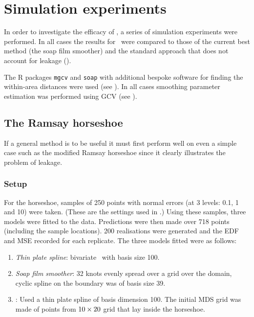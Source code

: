 \section{Simulation experiments}
\label{mdssims}

In order to investigate the efficacy of \mdsap, a series of simulation experiments were performed. In all cases the results for \mdsap\ were compared to those of the current best method (the soap film smoother) and the standard approach that does not account for leakage (\tprs).

The \textsf{R} packages \texttt{mgcv} and \texttt{soap} with additional bespoke software for finding the within-area distances were used (see ). In all cases smoothing parameter estimation was performed using GCV (see ).

\subsection{The Ramsay horseshoe}

If a general method is to be useful it must first perform well on even a simple case such as the modified Ramsay horseshoe since it clearly illustrates the problem of leakage.

\subsubsection{Setup}

For the horseshoe, samples of 250 points with normal errors (at 3 levels: 0.1, 1 and 10) were taken. (These are the settings used in \cite{soap}.) Using these samples, three models were fitted to the data. Predictions were then made over 718 points (including the sample locations). 200 realisations were generated and the EDF and MSE recorded for each replicate. The three models fitted were as follows:

\begin{enumerate}
\item \emph{Thin plate spline}: bivariate \tprs\  with basis size 100.
\item \emph{Soap film smoother}: 32 knots evenly spread over a grid over the domain, cyclic spline on the boundary was of basis size 39.
\item \emph{\mdsap}: Used a thin plate spline of basis dimension 100. The initial MDS grid was made of points from $10\times 20$ grid that lay inside the horseshoe.
\end{enumerate} 

